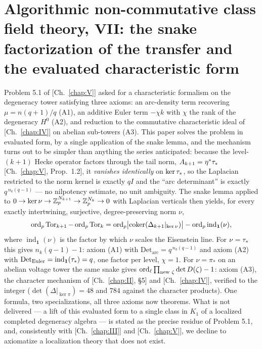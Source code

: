 \renewcommand{\ind}{\operatorname{ind}_{\mathbf1}}
\chapter[VII. The snake factorization of the transfer and the evaluated characteristic form]{Algorithmic non-commutative class field theory, VII: the snake factorization of the transfer and the evaluated characteristic form}\label{chap:VII}
\begin{chapterabstract}
Problem 5.1 of [Ch.~\ref{chap:V}] asked for a characteristic formalism on the degeneracy tower
satisfying three axioms: an arc-density term recovering $\mu=n(q+1)/q$ (A1), an
additive Euler term $-\chi k$ with $\chi$ the rank of the degeneracy $H^0$ (A2), and
reduction to the commutative characteristic ideal of [Ch.~\ref{chap:IV}] on abelian sub-towers
(A3). This paper solves the problem in evaluated form, by a single application of
the snake lemma, and the mechanism turns out to be simpler than anything the series
anticipated: because the level-$(k{+}1)$ Hecke operator factors through the tail
norm, $A_{k+1}=\eta^*\tau_*$ {\rm[Ch.~\ref{chap:V}, Prop.~1.2]}, it \emph{vanishes identically} on
$\ker\tau_*$, so the Laplacian restricted to the norm kernel is exactly $qI$ and the
``arc determinant'' is exactly $q^{\,n_k(q-1)}$ --- no nilpotency estimate, no unit
ambiguity. The snake lemma applied to
$0\to\ker\nu\to\mathbb{Z}_p^{N_{k+1}}\to\mathbb{Z}_p^{N_k}\to0$ with Laplacian verticals then yields,
for every exactly intertwining, surjective, degree-preserving norm $\nu$,
\[
\ord_p\Tor_{k+1}-\ord_p\Tor_k
=\ord_p\bigl|\coker(\Delta_{k+1}|_{\ker\nu})\bigr|-\ord_p\ind(\nu),
\]
where $\ind(\nu)$ is the factor by which $\nu$ scales the Eisenstein line. For
$\nu=\tau_*$ this gives $n_k(q-1)-1$: axiom (A1) with $\mathrm{Det_{arc}}
=q^{\,n_k(q-1)}$ and axiom (A2) with $\mathrm{Det_{Euler}}=\ind(\ta)=q$, one factor
per level, $\chi=1$. For $\nu=\pi_*$ on an abelian voltage tower the same snake
gives $\operatorname{ord}_\ell\prod_{\text{new }\zeta}\det D(\zeta)-1$: axiom (A3), the character
mechanism of [Ch.~\ref{chap:II}, \S5] and [Ch.~\ref{chap:IV}], verified to the integer
($\det(\Delta|_{\ker\pi})=48$ and $784$ against the character products). One
formula, two specializations, all three axioms now theorems. What is not delivered
--- a lift of this evaluated form to a single class in $K_1$ of a localized
completed degeneracy algebra --- is stated as the precise residue of Problem 5.1,
and, consistently with [Ch.~\ref{chap:III}] and [Ch.~\ref{chap:V}], we decline to axiomatize a localization theory
that does not exist.
\end{chapterabstract}

